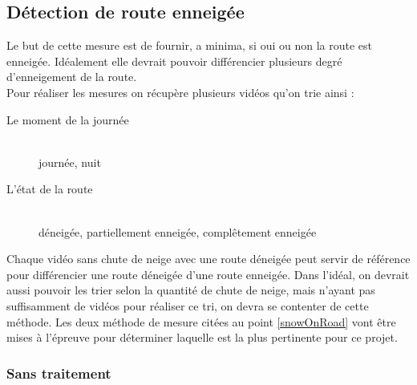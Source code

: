 \subsection{Détection de route enneigée}
Le but de cette mesure est de fournir, a minima, si oui ou non la route
est enneigée. Idéalement elle devrait pouvoir différencier plusieurs degré
d'enneigement de la route. \\
Pour réaliser les mesures on récupère plusieurs vidéos qu'on trie ainsi :
\begin{description}
    \item[Le moment de la journée] \hfill \\
    journée, nuit 
    \item[L'état de la route] \hfill \\
    déneigée, partiellement enneigée, complêtement enneigée 
\end{description}
Chaque vidéo sans chute de neige avec une route déneigée peut servir de 
référence pour différencier une route déneigée d'une route enneigée.
Dans l'idéal, on devrait aussi pouvoir les trier selon la quantité de chute
de neige, mais n'ayant pas suffisamment de vidéos pour réaliser ce tri, on devra
se contenter de cette méthode.
Les deux méthode de mesure citées au point \ref{snowOnRoad} vont être mises
à l'épreuve pour déterminer laquelle est la plus pertinente pour ce projet.

\subsubsection{Sans traitement}

